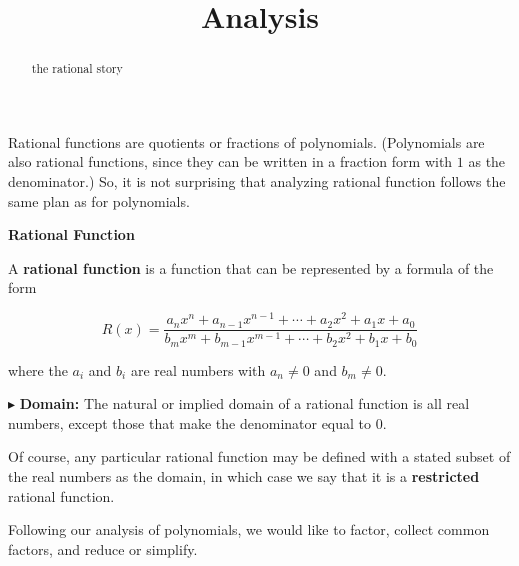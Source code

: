 \documentclass{ximera}
\title{Analysis}
\begin{document}
\begin{abstract}
the rational story
\end{abstract}
\maketitle








Rational functions are quotients or fractions of polynomials.  (Polynomials are also rational functions, since they can be written in a fraction form with $1$ as the denominator.)  So, it is not surprising that analyzing rational function follows the same plan as for polynomials.



















\begin{idea} \item \textbf{\textcolor{blue!55!black}{Rational Function}}  


A \textbf{rational function} is a function that can be represented by a formula of the form


\[   R(x) = \frac{a_n x^n + a_{n-1} x^{n-1} + \cdots + a_2 x^2 + a_1 x + a_0}{b_m x^m + b_{m-1} x^{m-1} + \cdots + b_2 x^2 + b_1 x + b_0}        \]

where the $a_i$ and $b_i$ are real numbers with $a_n \ne 0$ and $b_m \ne 0$.


\end{idea}



$\blacktriangleright$ \textbf{\textcolor{red!10!blue!90!}{Domain:}}  The natural or implied domain of a rational function is all real numbers, except those that make the denominator equal to $0$.  



Of course, any particular rational function may be defined with a stated subset of the real numbers as the domain, in which case we  say that it is a \textbf{restricted} rational function.








Following our analysis of polynomials, we would like to factor, collect common factors, and reduce or simplify.
\end{document}
